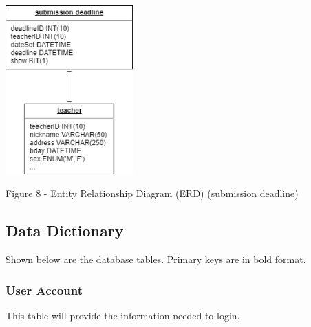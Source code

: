 \documentclass[11pt,a4paper,titlepage]{article}
\begin{document}
\vspace{1cm}
\begin{center}
    \includegraphics[height=6.5cm]{Submission-Deadline.png}
\end{center}
\vspace{1cm}
\begin{center}
    Figure 8 - Entity Relationship Diagram (ERD) (submission deadline)
\end{center}


\newpage

\subsection{Data Dictionary}

Shown below are the database tables. Primary keys are in bold format.

\subsubsection{User Account}

This table will provide the information needed to login.
\end{document}
